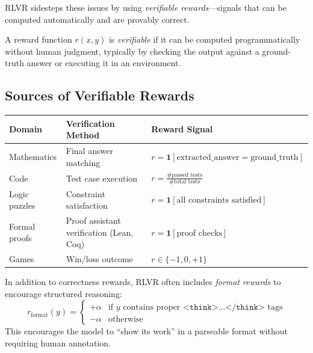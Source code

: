 RLVR sidesteps these issues by using \emph{verifiable rewards}---signals that can be computed automatically and are provably correct.

\begin{definition}
    A reward function $r(x, y)$ is \emph{verifiable} if it can be computed programmatically without human judgment, typically by checking the output against a ground-truth answer or executing it in an environment.
\end{definition}

\subsection{Sources of Verifiable Rewards}

\begin{center}
    \renewcommand{\arraystretch}{1.4}
    \begin{tabular}{l|l|l}
        \textbf{Domain} & \textbf{Verification Method}             & \textbf{Reward Signal}                                            \\
        \hline
        Mathematics     & Final answer matching                    & $r = \mathbf{1}[\text{extracted\_answer} = \text{ground\_truth}]$ \\
        Code            & Test case execution                      & $r = \frac{\text{\# passed tests}}{\text{\# total tests}}$        \\
        Logic puzzles   & Constraint satisfaction                  & $r = \mathbf{1}[\text{all constraints satisfied}]$                \\
        Formal proofs   & Proof assistant verification (Lean, Coq) & $r = \mathbf{1}[\text{proof checks}]$                             \\
        Games           & Win/loss outcome                         & $r \in \{-1, 0, +1\}$                                             \\
    \end{tabular}
\end{center}

\begin{remark}
    In addition to correctness rewards, RLVR often includes \emph{format rewards} to encourage structured reasoning:
    \[
        r_{\text{format}}(y) = \begin{cases}
            +\alpha & \text{if } y \text{ contains proper } \texttt{<think>}\ldots\texttt{</think>} \text{ tags} \\
            -\alpha & \text{otherwise}
        \end{cases}
    \]
    This encourages the model to ``show its work'' in a parseable format without requiring human annotation.
\end{remark}

